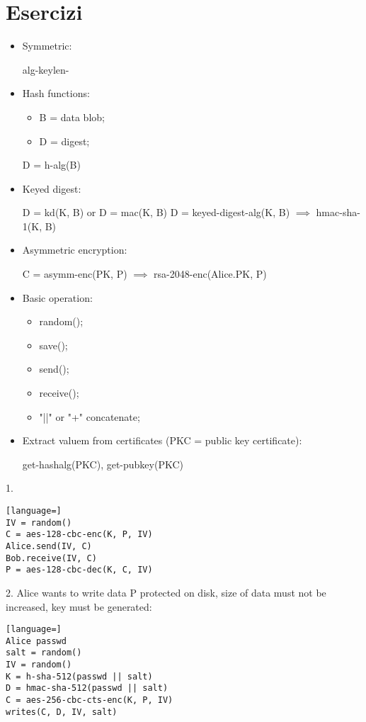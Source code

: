 \documentclass[12pt]{article}
\begin{document}
\section{Esercizi}
\begin{itemize}
    \item Symmetric:

        alg-keylen-
    \item Hash functions:
        \begin{itemize}
            \item B = data blob;
            \item D = digest;
        \end{itemize}
        D = h-alg(B)
    \item Keyed digest:

        D = kd(K, B) or D = mac(K, B)
        D = keyed-digest-alg(K, B) $ \implies $ hmac-sha-1(K, B)
    \item Asymmetric encryption:

        C = asymm-enc(PK, P) $ \implies $ rsa-2048-enc(Alice.PK, P)
    \item Basic operation:
        \begin{itemize}
            \item random();
            \item save();
            \item send();
            \item receive();
            \item "||" or "+" concatenate;
        \end{itemize}
    \item Extract valuem from certificates (PKC = public key certificate):

        get-hashalg(PKC), get-pubkey(PKC)
\end{itemize}

1.
\begin{lstlisting}[language=]
IV = random()
C = aes-128-cbc-enc(K, P, IV)
Alice.send(IV, C)
Bob.receive(IV, C)
P = aes-128-cbc-dec(K, C, IV)
\end{lstlisting}

2. Alice wants to write data P protected on disk, size of data must not be increased, key must be generated:
\begin{lstlisting}[language=]
Alice passwd
salt = random()
IV = random()
K = h-sha-512(passwd || salt)
D = hmac-sha-512(passwd || salt)
C = aes-256-cbc-cts-enc(K, P, IV)
writes(C, D, IV, salt)
\end{lstlisting}
\end{document}
